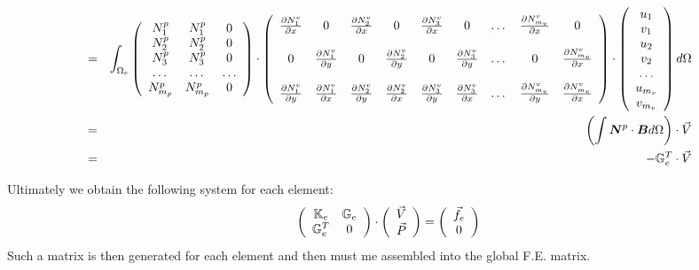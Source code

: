 \begin{eqnarray}
&=& 
\int_{\Omega_e} 
\left(
\begin{array}{ccc}
{N}_1^p & {N}_1^p & 0 \\
{N}_2^p & {N}_2^p & 0 \\
{N}_3^p & {N}_3^p & 0 \\
\dots & \dots & \dots \\
{N}_{m_p}^p & {N}_{m_p}^p & 0 
\end{array}
\right)
\cdot
\left(
\begin{array}{ccccccccccc}
\frac{\partial N_1^v}{\partial x} & 0 & 
\frac{\partial N_2^v}{\partial x} & 0 & 
\frac{\partial N_3^v}{\partial x} & 0 & \dots & 
\frac{\partial N_{m_v}^v}{\partial x} & 0
\\  \\
0 & \frac{\partial N_1^v}{\partial y} & 
0 & \frac{\partial N_2^v}{\partial y} &
0 & \frac{\partial N_3^v}{\partial y} & \dots & 
0 & \frac{\partial N_{m_v}^v}{\partial x} 
\\ \\
\frac{\partial N_1^v}{\partial y} &  \frac{\partial N_1^v}{\partial x} &  
\frac{\partial N_2^v}{\partial y} &  \frac{\partial N_2^v}{\partial x} & 
\frac{\partial N_3^v}{\partial y} &  \frac{\partial N_3^v}{\partial x} &   \dots &  
\frac{\partial N_{m_v}^v}{\partial y} &  \frac{\partial N_{m_v}^v}{\partial x}  
\end{array}
\right) 
\cdot
\left(
\begin{array}{c}
u_1 \\ v_1 \\ u_2 \\ v_2 \\ \dots \\ u_{m_v} \\ v_{m_v}
\end{array}
\right)
d\Omega  \nonumber \\
&=& 
\left(\int {\bm N}^p \cdot {\bm B} d\Omega \right) \cdot \vec{V} \nonumber\\
&=& -{\mathbb{G}}_e^T \cdot {\vec V}
\end{eqnarray}


Ultimately we obtain the following system for each element:
\[
\left(
\begin{array}{cc}
{\mathbb{K}}_e & {\mathbb{G}}_e \\
{\mathbb{G}}_e^T & 0
\end{array}
\right)
\cdot
\left(
\begin{array}{c}
\vec{V} \\ \vec{P} 
\end{array}
\right)
=
\left(
\begin{array}{c}
\vec{f}_e \\ 0 
\end{array}
\right)
\]
Such a matrix is then generated for each element and then must me assembled into the 
global F.E. matrix. 








